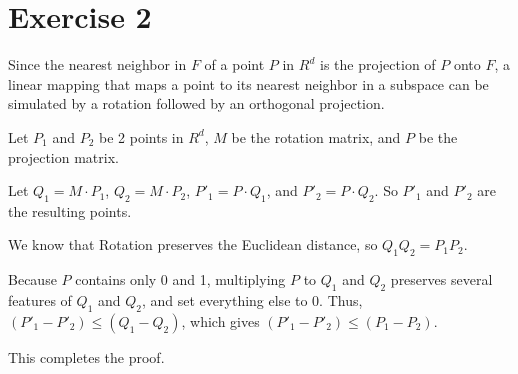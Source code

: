 \section*{Exercise 2}
Since the nearest neighbor in $F$ of a point $P$ in $R^d$ is the projection of $P$ onto $F$, a linear mapping that maps a point to its nearest neighbor in a subspace can
be simulated by a rotation followed by an orthogonal projection.

Let $P_1$ and $P_2$ be 2 points in $R^d$, $M$ be the rotation matrix, and $P$ be the projection matrix. 

Let $Q_1 = M \cdot P_1$, $Q_2 = M \cdot P_2$, $P'_1 = P \cdot Q_1$, and $P'_2 = P \cdot Q_2$. So $P'_1$ and $P'_2$ are the resulting points.

We know that Rotation preserves the Euclidean distance, so $Q_1 Q_2 = P_1 P_2$.

Because $P$ contains only 0 and 1, multiplying $P$ to $Q_1$ and $Q_2$ preserves several features of $Q_1$ and $Q_2$, and set everything else to 0. Thus, $(P'_1 - P'_2) \leq (Q_1 - Q_2)$, which gives $(P'_1 - P'_2) \leq (P_1 - P_2)$.

This completes the proof.
